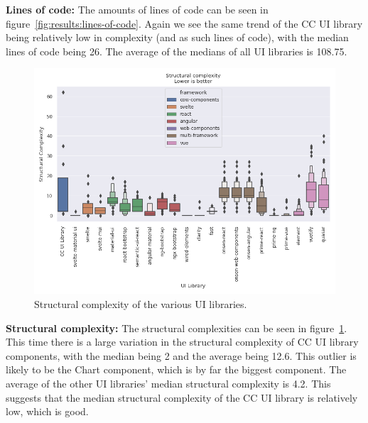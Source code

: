 \textbf{Lines of code:} The amounts of lines of code can be seen in figure~\ref{fig:results:lines-of-code}. Again we see the same trend of the CC UI library being relatively low in complexity (and as such lines of code), with the median lines of code being 26. The average of the medians of all UI libraries is 108.75.

\begin{figure}[htbp]
  \includegraphics[width=\columnwidth]{plots/structural-complexity.png}
  \caption{Structural complexity of the various UI libraries.}
  \label{fig:results:structural-complexity}
  \centering
\end{figure}

\textbf{Structural complexity:} The structural complexities can be seen in figure~\ref{fig:results:structural-complexity}. This time there is a large variation in the structural complexity of CC UI library components, with the median being 2 and the average being 12.6. This outlier is likely to be the Chart component, which is by far the biggest component. The average of the other UI libraries' median structural complexity is 4.2. This suggests that the median structural complexity of the CC UI library is relatively low, which is good.

